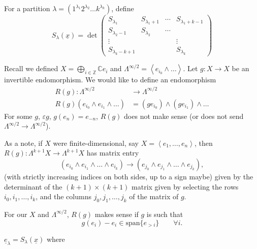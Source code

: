 For a partition
$\lambda=(1^{\lambda_1}2^{\lambda_2}\ldots k^{\lambda_k})$,
define
$$
S_\lambda(\underline{x})
=\det
\begin{pmatrix}
S_{\lambda_1}& S_{\lambda_1+1}&\cdots &  S_{\lambda_1+k-1}\\
S_{\lambda_2-1}& S_{\lambda_2}&\cdots & \\
\vdots &  &  &  \vdots \\
S_{\lambda_k-k+1}&  &  &  S_{\lambda_k}
\end{pmatrix}
$$

Recall we defined $X=\bigoplus_{i \in \mathbb{Z}}\mathbb{C}e_i$
and $\Lambda^{\infty/2}=\left<e_{i_0}\wedge\ldots\right>$.
Let $g:X \to X$ be an invertible endomorphism.
We would like to 
define an endomorphism
\begin{align*}
R(g): \Lambda^{\infty/2} &\longrightarrow \Lambda^{\infty/2} \\
R(g)(e_{i_0}\wedge e_{i_1}\wedge\ldots) &=
(ge_{i_0})\wedge(ge_{i_1})\wedge \ldots 
\end{align*}
For some $g$, $\varepsilon g$, $g(e_n)=e_{-n}$,
$R(g)$ does not make sense
(or does not send  $\Lambda^{\infty/2}\to \Lambda^{\infty/2}$).

As a note, if $X$ were finite-dimensional,
say $X=\left<e_1,\ldots,e_n\right>$,
then $R(g):\Lambda^{k+1}X \to \Lambda^{k+1}X$
has matrix entry
$$
(e_{i_0}\wedge e_{i_1}\wedge\ldots\wedge e_{i_k})
\to(e_{j_0}\wedge e_{j_1} \wedge \ldots \wedge e_{j_k}),
$$
(with strictly increasing indices on both sides,
up to a sign maybe)
given by the determinant of the $(k+1)\times(k+1)$ 
matrix given by selecting the rows
$i_0,i_1,\ldots,i_k$, and the columns
$j_0,j_1,\ldots,j_k$ of the matrix of $g$.

\medskip\noindent
For our $X$ and $\Lambda^{\infty/2}$,
$R(g)$ makes sense if $g$ is such that 
$$
g(e_i)-e_i \in \text{span} \{ e_{>i}\}\qquad \forall i.
$$

\begin{proposition}
\label{proposition-schur-polynomials}
$\underline{e}_\lambda=S_\lambda(\underline{x})$
where 
\end{proposition}

